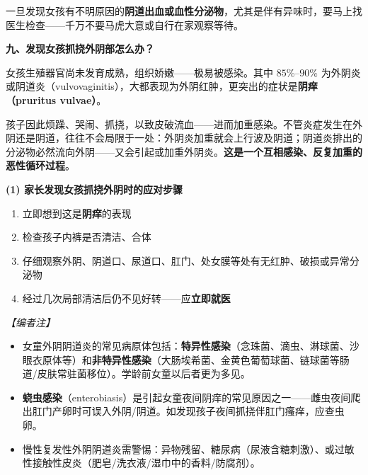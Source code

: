 \begin{enumerate}
\begin{tcolorbox}[colback=pink!5!white,colframe=red!50!black,title=贴心小叮咛]
一旦发现女孩有不明原因的\textbf{阴道出血或血性分泌物}，尤其是伴有异味时，要马上找医生检查——千万不要马虎大意或自行在家观察等待。
\end{tcolorbox}

\vspace{0.8em}
\noindent\textbf{九、发现女孩抓挠外阴部怎么办？}

女孩生殖器官尚未发育成熟，组织娇嫩——极易被感染。其中 $85\%$--$90\%$ 为外阴炎或阴道炎（vulvovaginitis），大都表现为外阴红肿，更突出的症状是\textbf{阴痒（pruritus vulvae）}。

孩子因此烦躁、哭闹、抓挠，以致皮破流血——进而加重感染。不管炎症发生在外阴还是阴道，往往不会局限于一处：外阴炎加重就会上行波及阴道；阴道炎排出的分泌物必然流向外阴——又会引起或加重外阴炎。\textbf{这是一个互相感染、反复加重的恶性循环过程}。

\vspace{0.5em}
\noindent\textbf{(1) 家长发现女孩抓挠外阴时的应对步骤}

\begin{enumerate}
	\item 立即想到这是\textbf{阴痒}的表现
	\item 检查孩子内裤是否清洁、合体
	\item 仔细观察外阴、阴道口、尿道口、肛门、处女膜等处有无红肿、破损或异常分泌物
	\item 经过几次局部清洁后仍不见好转——应\textbf{立即就医}
\end{enumerate}

\vspace{0.3em}
\noindent\textit{【编者注】}
\begin{itemize}
	\item 女童外阴阴道炎的常见病原体包括：\textbf{特异性感染}（念珠菌、滴虫、淋球菌、沙眼衣原体等）和\textbf{非特异性感染}（大肠埃希菌、金黄色葡萄球菌、链球菌等肠道/皮肤常驻菌移位）。学龄前女童以后者更为多见。
	\item \textbf{蛲虫感染}（enterobiasis）是引起女童夜间阴痒的常见原因之一——雌虫夜间爬出肛门产卵时可误入外阴/阴道。如发现孩子夜间抓挠伴肛门瘙痒，应查虫卵。
	\item 慢性复发性外阴阴道炎需警惕：异物残留、糖尿病（尿液含糖刺激）、或过敏性接触性皮炎（肥皂/洗衣液/湿巾中的香料/防腐剂）。
\end{itemize}


\end{enumerate}
